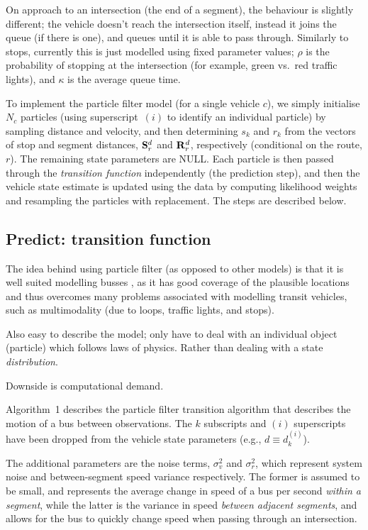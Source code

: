 \documentclass[draftcls,a4paper,onecolumn]{IEEEtran}\usepackage[]{graphicx}\usepackage[]{color}
\begin{document}
On approach to an intersection (the end of a segment),
the behaviour is slightly different;
the vehicle doesn't reach the intersection itself, instead it joins the queue
(if there is one), and queues until it is able to pass through.
Similarly to stops, currently this is just modelled using fixed parameter values;
$\rho$ is the probability of stopping at the intersection
(for example, green vs.\ red traffic lights),
and $\kappa$ is the average queue time.


To implement the particle filter model (for a single vehicle $c$), 
we simply initialise $N_c$ particles (using superscript~${(i)}$ to identify an individual particle)
by sampling distance and velocity, and then determining $s_k$ and $r_k$ from the 
vectors of stop and segment distances, $\mathbf{S}^d_r$ and $\mathbf{R}^d_r$, respectively
(conditional on the route, $r$).
The remaining state parameters are NULL.
Each particle is then passed through the \emph{transition function} independently (the prediction step),
and then the vehicle state estimate is updated using the data by computing likelihood weights
and resampling the particles with replacement.
The steps are described below.


\subsection{Predict: transition function}
The idea behind using particle filter (as opposed to other models)
is that it is well suited modelling busses \cite{Hans_2015},
as it has good coverage of the plausible locations and thus overcomes
many problems associated with modelling transit vehicles,
such as multimodality (due to loops, traffic lights, and stops).

Also easy to describe the model;
only have to deal with an individual object (particle) which follows laws of physics.
Rather than dealing with a state \emph{distribution}.

Downside is computational demand.

Algorithm~1 describes the particle filter transition algorithm that
describes the motion of a bus between observations.
The $k$ subscripts and $(i)$ superscripts have been dropped from the
vehicle state parameters (e.g., $d \equiv d_k^{(i)}$).

The additional parameters are the noise terms, $\sigma_v^2$ and $\sigma_r^2$,
which represent system noise and between-segment speed variance respectively.
The former is assumed to be small, and represents the average change in speed
of a bus per second \emph{within a segment},
while the latter is the variance in speed \emph{between adjacent segments},
and allows for the bus to quickly change speed when passing through an intersection.
\end{document}
